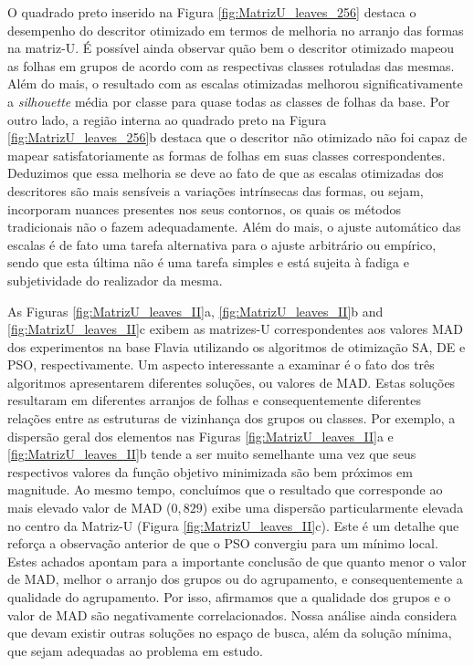 O quadrado preto inserido na Figura \ref{fig:MatrizU_leaves_256} destaca o desempenho do descritor otimizado em termos de melhoria no arranjo das formas na matriz-U. É possível ainda observar quão bem o descritor otimizado mapeou as folhas em grupos de acordo com as respectivas classes rotuladas das mesmas.  Além do mais, o resultado com as escalas otimizadas melhorou significativamente a \emph{silhouette} média por classe para quase todas as classes de folhas da base. Por outro lado, a região interna ao quadrado preto na Figura \ref{fig:MatrizU_leaves_256}b destaca que o descritor não otimizado não foi capaz de mapear satisfatoriamente as formas de  folhas em suas classes correspondentes. Deduzimos que essa melhoria se deve ao fato de que as escalas otimizadas dos descritores são mais sensíveis a variações intrínsecas das formas, ou sejam, incorporam nuances presentes nos seus contornos, os quais os métodos tradicionais não o fazem adequadamente. Além do mais, o ajuste automático das escalas é de fato uma tarefa alternativa para o ajuste arbitrário ou empírico, sendo que esta última não é uma tarefa simples e está sujeita à fadiga e subjetividade do realizador da mesma.


As Figuras \ref{fig:MatrizU_leaves_II}a, \ref{fig:MatrizU_leaves_II}b and \ref{fig:MatrizU_leaves_II}c exibem as matrizes-U correspondentes aos valores MAD dos experimentos na base Flavia utilizando os algoritmos de otimização SA, DE e PSO, respectivamente. Um aspecto interessante a examinar é o fato dos três algoritmos apresentarem diferentes soluções, ou valores de MAD. Estas soluções resultaram em diferentes arranjos de folhas e consequentemente diferentes relações entre as estruturas de vizinhança dos grupos ou classes.
Por exemplo, a dispersão geral dos elementos nas Figuras \ref{fig:MatrizU_leaves_II}a e \ref{fig:MatrizU_leaves_II}b tende a ser muito semelhante uma vez que seus respectivos valores da função objetivo minimizada são bem próximos em magnitude. Ao mesmo tempo, concluímos que o resultado que corresponde ao mais elevado valor de MAD ($0,829$) exibe uma dispersão particularmente elevada no centro da Matriz-U (Figura \ref{fig:MatrizU_leaves_II}c). Este é um detalhe que reforça a observação anterior de que o PSO convergiu para um mínimo local. 
Estes achados apontam para a importante conclusão de que quanto menor o valor de MAD, melhor o arranjo dos grupos ou do agrupamento, e consequentemente a qualidade do agrupamento. Por isso, afirmamos que a qualidade dos grupos e o valor de MAD são negativamente correlacionados. Nossa análise ainda considera que devam existir outras soluções no espaço de busca, além da solução mínima, que sejam adequadas ao problema em estudo.

